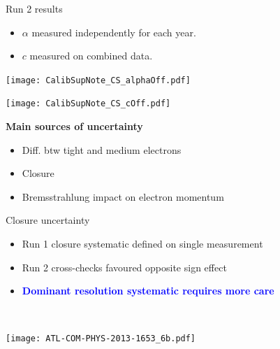 \begin{frame}{Run 2 results}
  \begin{itemize}
  \item $\alpha$ measured independently for each year.
  \item $c$ measured on combined data.
    \end{itemize}

  \begin{minipage}{0.49\linewidth} 
    \texttt{[image: CalibSupNote\_CS\_alphaOff.pdf]}
  \end{minipage}
  \hfill
  \begin{minipage}{0.49\linewidth}
    \texttt{[image: CalibSupNote\_CS\_cOff.pdf]}
  \end{minipage}

    \begin{center}
    \begin{minipage}{0.7\linewidth}
      \centering
      {\bf Main sources of uncertainty }
      \begin{itemize}
      \item Diff. btw tight and medium electrons
      \item Closure
      \item Bremsstrahlung impact on electron momentum
      \end{itemize}
    \end{minipage}
  \end{center}

\end{frame}
\begin{frame}{Closure uncertainty}
  \centering
  \begin{minipage}{0.9\linewidth}
    \begin{itemize}
    \item Run 1 closure systematic defined on single measurement
    \item Run 2 cross-checks favoured opposite sign effect
    \item \textcolor{blue}{\bf Dominant resolution systematic requires more care}
    \end{itemize}
  \end{minipage}
  \\
  \begin{minipage}{0.49\linewidth}
    \texttt{[image: ATL-COM-PHYS-2013-1653\_6b.pdf]}
  \end{minipage}
\end{frame}
